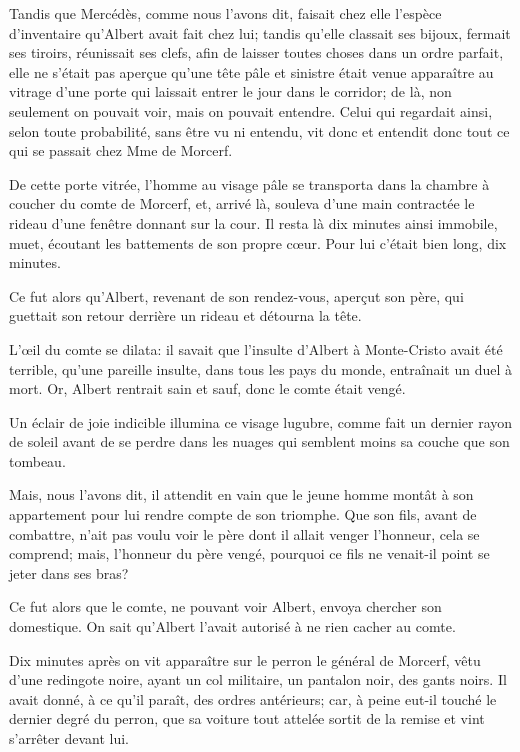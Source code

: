 Tandis que Mercédès, comme nous l'avons dit, faisait chez elle l'espèce d'inventaire qu'Albert avait fait chez lui; tandis qu'elle classait ses bijoux, fermait ses tiroirs, réunissait ses clefs, afin de laisser toutes choses dans un ordre parfait, elle ne s'était pas aperçue qu'une tête pâle et sinistre était venue apparaître au vitrage d'une porte qui laissait entrer le jour dans le corridor; de là, non seulement on pouvait voir, mais on pouvait entendre. Celui qui regardait ainsi, selon toute probabilité, sans être vu ni entendu, vit donc et entendit donc tout ce qui se passait chez Mme de Morcerf. 

De cette porte vitrée, l'homme au visage pâle se transporta dans la chambre à coucher du comte de Morcerf, et, arrivé là, souleva d'une main contractée le rideau d'une fenêtre donnant sur la cour. Il resta là dix minutes ainsi immobile, muet, écoutant les battements de son propre cœur. Pour lui c'était bien long, dix minutes. 

Ce fut alors qu'Albert, revenant de son rendez-vous, aperçut son père, qui guettait son retour derrière un rideau et détourna la tête. 

L'œil du comte se dilata: il savait que l'insulte d'Albert à Monte-Cristo avait été terrible, qu'une pareille insulte, dans tous les pays du monde, entraînait un duel à mort. Or, Albert rentrait sain et sauf, donc le comte était vengé. 

Un éclair de joie indicible illumina ce visage lugubre, comme fait un dernier rayon de soleil avant de se perdre dans les nuages qui semblent moins sa couche que son tombeau. 

Mais, nous l'avons dit, il attendit en vain que le jeune homme montât à son appartement pour lui rendre compte de son triomphe. Que son fils, avant de combattre, n'ait pas voulu voir le père dont il allait venger l'honneur, cela se comprend; mais, l'honneur du père vengé, pourquoi ce fils ne venait-il point se jeter dans ses bras? 

Ce fut alors que le comte, ne pouvant voir Albert, envoya chercher son domestique. On sait qu'Albert l'avait autorisé à ne rien cacher au comte. 

Dix minutes après on vit apparaître sur le perron le général de Morcerf, vêtu d'une redingote noire, ayant un col militaire, un pantalon noir, des gants noirs. Il avait donné, à ce qu'il paraît, des ordres antérieurs; car, à peine eut-il touché le dernier degré du perron, que sa voiture tout attelée sortit de la remise et vint s'arrêter devant lui. 

